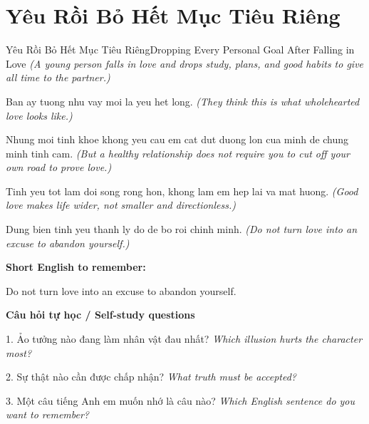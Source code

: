 \section{Yêu Rồi Bỏ Hết Mục Tiêu Riêng}
\begin{truyen}{Yêu Rồi Bỏ Hết Mục Tiêu Riêng}{Dropping Every Personal Goal After Falling in Love}
\textit{(A young person falls in love and drops study, plans, and good habits to give all time to the partner.)}

Ban ay tuong nhu vay moi la yeu het long.
\textit{(They think this is what wholehearted love looks like.)}

Nhung moi tinh khoe khong yeu cau em cat dut duong lon cua minh de chung minh tinh cam.
\textit{(But a healthy relationship does not require you to cut off your own road to prove love.)}

Tinh yeu tot lam doi song rong hon, khong lam em hep lai va mat huong.
\textit{(Good love makes life wider, not smaller and directionless.)}

\end{truyen}

\begin{baihoc}
Dung bien tinh yeu thanh ly do de bo roi chinh minh.
\textit{(Do not turn love into an excuse to abandon yourself.)}
\end{baihoc}

\begin{ghinhoanh}
\textbf{Short English to remember:}

Do not turn love into an excuse to abandon yourself.

\end{ghinhoanh}

\begin{tuhocnhanh}
\textbf{Câu hỏi tự học / Self-study questions}

1. Ảo tưởng nào đang làm nhân vật đau nhất? \textit{Which illusion hurts the character most?}

2. Sự thật nào cần được chấp nhận? \textit{What truth must be accepted?}

3. Một câu tiếng Anh em muốn nhớ là câu nào? \textit{Which English sentence do you want to remember?}
\end{tuhocnhanh}
\ngancach

